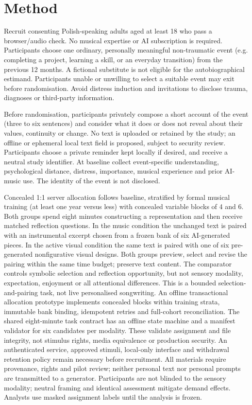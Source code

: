 \documentclass[11pt,a4paper]{article}
\begin{document}
\section{Method}
Recruit consenting Polish-speaking adults aged at least 18 who pass a browser/audio check. No musical expertise or AI subscription is required. Participants choose one ordinary, personally meaningful non-traumatic event (e.g. completing a project, learning a skill, or an everyday transition) from the previous 12 months. A fictional substitute is not eligible for the autobiographical estimand. Participants unable or unwilling to select a suitable event may exit before randomisation. Avoid distress induction and invitations to disclose trauma, diagnoses or third-party information.
\par Before randomisation, participants privately compose a short account of the event (three to six sentences) and consider what it does or does not reveal about their values, continuity or change. No text is uploaded or retained by the study; an offline or ephemeral local text field is proposed, subject to security review. Participants choose a private reminder kept locally if desired, and receive a neutral study identifier. At baseline collect event-specific understanding, psychological distance, distress, importance, musical experience and prior AI-music use. The identity of the event is not disclosed.
\par Concealed 1:1 server allocation follows baseline, stratified by formal musical training (at least one year versus less) with concealed variable blocks of 4 and 6. Both groups spend eight minutes constructing a representation and then receive matched reflection questions. In the music condition the unchanged text is paired with an instrumental excerpt chosen from a frozen bank of six AI-generated pieces. In the active visual condition the same text is paired with one of six pre-generated nonfigurative visual designs. Both groups preview, select and revise the pairing within the same time budget; preserve text content. The comparator controls symbolic selection and reflection opportunity, but not sensory modality, expectation, enjoyment or all attentional differences. This is a bounded selection-and-pairing task, not live personalised songwriting. An offline transactional allocation prototype implements concealed blocks within training strata, immutable bank binding, idempotent retries and full-cohort reconciliation. The shared eight-minute task contract has an offline state machine and a manifest validator for six candidates per modality. These validate assignment and file integrity, not stimulus rights, media equivalence or production security. An authenticated service, approved stimuli, local-only interface and withdrawal retention policy remain necessary before recruitment. All materials require provenance, rights and pilot review; neither personal text nor personal prompts are transmitted to a generator. Participants are not blinded to the sensory modality; neutral framing and identical assessment mitigate demand effects. Analysts use masked assignment labels until the analysis is frozen.
\end{document}
